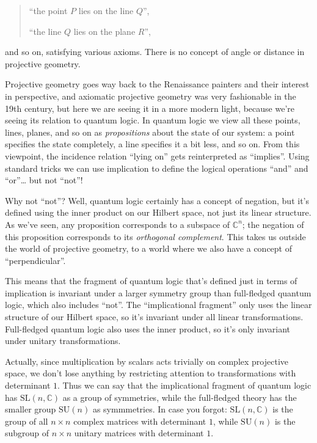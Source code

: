 \documentclass{article}
\begin{document}
\begin{quote}
``the point \(P\) lies on the line \(Q\)'',

``the line \(Q\) lies on the plane \(R\)'',
\end{quote}

and so on, satisfying various axioms. There is no concept of angle or
distance in projective geometry.

Projective geometry goes way back to the Renaissance painters and their
interest in perspective, and axiomatic projective geometry was very
fashionable in the 19th century, but here we are seeing it in a more
modern light, because we're seeing its relation to quantum logic. In
quantum logic we view all these points, lines, planes, and so on as
\emph{propositions} about the state of our system: a point specifies the
state completely, a line specifies it a bit less, and so on. From this
viewpoint, the incidence relation ``lying on'' gets reinterpreted as
``implies''. Using standard tricks we can use implication to define the
logical operations ``and'' and ``or''\ldots{} but not ``not''!

Why not ``not''? Well, quantum logic certainly has a concept of
negation, but it's defined using the inner product on our Hilbert space,
not just its linear structure. As we've seen, any proposition
corresponds to a subspace of \(\mathbb{C}^n\); the negation of this
proposition corresponds to its \emph{orthogonal complement}. This takes
us outside the world of projective geometry, to a world where we also
have a concept of ``perpendicular''.

This means that the fragment of quantum logic that's defined just in
terms of implication is invariant under a larger symmetry group than
full-fledged quantum logic, which also includes ``not''. The
``implicational fragment'' only uses the linear structure of our Hilbert
space, so it's invariant under all linear transformations. Full-fledged
quantum logic also uses the inner product, so it's only invariant under
unitary transformations.

Actually, since multiplication by scalars acts trivially on complex
projective space, we don't lose anything by restricting attention to
transformations with determinant \(1\). Thus we can say that the
implicational fragment of quantum logic has
\(\mathrm{SL}(n,\mathbb{C})\) as a group of symmetries, while the
full-fledged theory has the smaller group \(\mathrm{SU}(n)\) as
symmmetries. In case you forgot: \(\mathrm{SL}(n,\mathbb{C})\) is the
group of all \(n\times n\) complex matrices with determinant \(1\),
while \(\mathrm{SU}(n)\) is the subgroup of \(n\times n\) unitary
matrices with determinant \(1\).
\end{document}
